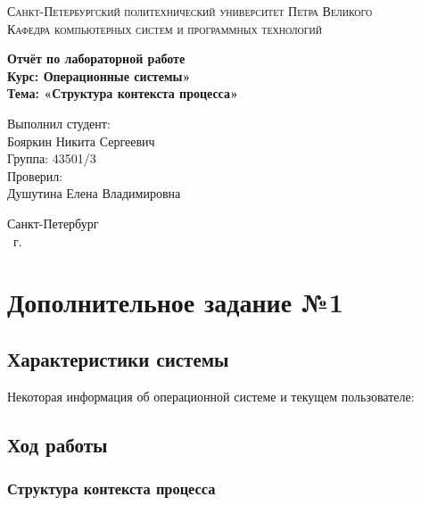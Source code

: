\documentclass[14pt,a4paper,report]{report}
\begin{document}
\def\contentsname{Содержание}

\begin{titlepage}
	\begin{center}
		\textsc{Санкт-Петербургский политехнический 
			университет Петра Великого\\[5mm]
			Кафедра компьютерных систем и программных технологий}
		
		\vfill
		
		\textbf{Отчёт по лабораторной работе\\[3mm]
			Курс: Операционные системы»\\[6mm]
			Тема: «Структура контекста процесса»\\[35mm]
		}
	\end{center}
	
	\hfill
	\begin{minipage}{.5\textwidth}
		Выполнил студент:\\[2mm] 
		Бояркин Никита Сергеевич\\
		Группа: 43501/3\\[5mm]
		
		Проверил:\\[2mm] 
		Душутина Елена Владимировна
	\end{minipage}
	\vfill
	\begin{center}
		Санкт-Петербург\\ \the\year\ г.
	\end{center}
\end{titlepage}

\tableofcontents
\clearpage

\chapter{Дополнительное задание №1}

\section{Характеристики системы}

Некоторая информация об операционной системе и текущем пользователе:



\section{Ход работы}

\subsection{Структура контекста процесса}
\end{document}
